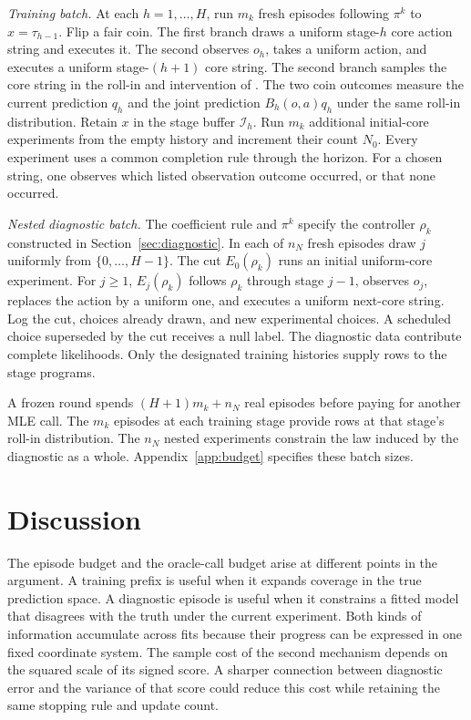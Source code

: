 \documentclass[sigconf,nonacm]{acmart}
\newcommand{\I}{\mathcal I}
\newcommand{\sect}[1]{Section~\ref{#1}}
\begin{document}
\emph{Training batch.} At each $h=1,\ldots,H$, run $m_k$ fresh episodes following $\pi^k$ to $x=\tau_{h-1}$. Flip a fair coin. The first branch draws a uniform stage-$h$ core action string and executes it. The second observes $o_h$, takes a uniform action, and executes a uniform stage-$(h+1)$ core string. The second branch samples the core string in the roll-in and intervention of \citet[Eq.~(10)]{omle}. The two coin outcomes measure the current prediction $q_h$ and the joint prediction $B_h(o,a)q_h$ under the same roll-in distribution. Retain $x$ in the stage buffer $\I_h$. Run $m_k$ additional initial-core experiments from the empty history and increment their count $N_0$. Every experiment uses a common completion rule through the horizon. For a chosen string, one observes which listed observation outcome occurred, or that none occurred.

\emph{Nested diagnostic batch.} The coefficient rule and $\pi^k$ specify the controller $\rho_k$ constructed in \sect{sec:diagnostic}. In each of $n_N$ fresh episodes draw $j$ uniformly from $\{0,\ldots,H-1\}$. The cut $E_0(\rho_k)$ runs an initial uniform-core experiment. For $j\ge1$, $E_j(\rho_k)$ follows $\rho_k$ through stage $j-1$, observes $o_j$, replaces the action by a uniform one, and executes a uniform next-core string. Log the cut, choices already drawn, and new experimental choices. A scheduled choice superseded by the cut receives a null label. The diagnostic data contribute complete likelihoods. Only the designated training histories supply rows to the stage programs.

A frozen round spends $(H+1)m_k+n_N$ real episodes before paying for another MLE call. The $m_k$ episodes at each training stage provide rows at that stage's roll-in distribution. The $n_N$ nested experiments constrain the law induced by the diagnostic as a whole. Appendix~\ref{app:budget} specifies these batch sizes.






\section{Discussion}
The episode budget and the oracle-call budget arise at different points in the argument. A training prefix is useful when it expands coverage in the true prediction space. A diagnostic episode is useful when it constrains a fitted model that disagrees with the truth under the current experiment. Both kinds of information accumulate across fits because their progress can be expressed in one fixed coordinate system. The sample cost of the second mechanism depends on the squared scale of its signed score. A sharper connection between diagnostic error and the variance of that score could reduce this cost while retaining the same stopping rule and update count.



\appendix

\end{document}
